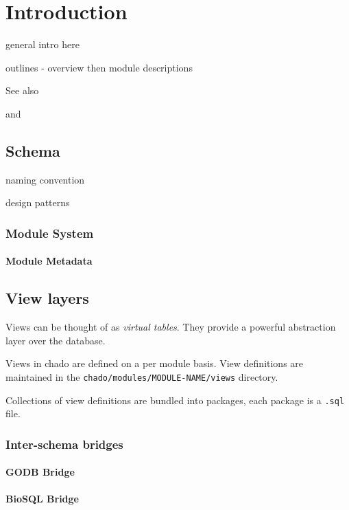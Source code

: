 \chapter{Introduction}

general intro here

outlines - overview then module descriptions

See also \GMOD

and \FlyBase

\section{Schema}

naming convention

design patterns

\subsection{Module System}

\subsubsection{Module Metadata}

\section{View layers}

Views can be thought of as {\em virtual tables}. They provide a
powerful abstraction layer over the database.

Views in chado are defined on a per module basis. View definitions are
maintained in the {\tt chado/modules/MODULE-NAME/views}
directory.

Collections of view definitions are bundled into packages,
each package is a {\tt .sql} file.

\subsection{Inter-schema bridges}

\subsubsection{GODB Bridge}

\subsubsection{BioSQL Bridge}

